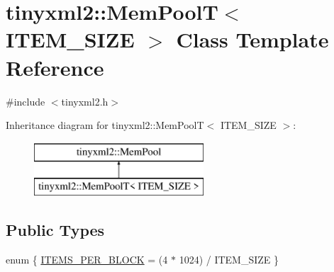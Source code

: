 \hypertarget{classtinyxml2_1_1_mem_pool_t}{}\section{tinyxml2\+:\+:Mem\+PoolT$<$ I\+T\+E\+M\+\_\+\+S\+I\+ZE $>$ Class Template Reference}
\label{classtinyxml2_1_1_mem_pool_t}


{\ttfamily \#include $<$tinyxml2.\+h$>$}

Inheritance diagram for tinyxml2\+:\+:Mem\+PoolT$<$ I\+T\+E\+M\+\_\+\+S\+I\+ZE $>$\+:\begin{figure}[H]
\begin{center}
\leavevmode
\includegraphics[height=2.000000cm]{classtinyxml2_1_1_mem_pool_t}
\end{center}
\end{figure}
\subsection*{Public Types}
\begin{DoxyCompactItemize}
\item 
enum \{ \hyperlink{classtinyxml2_1_1_mem_pool_t_a04cf45156e6f913f93972869ff8a1d94ab72c1e16d6626854c41feb19e60c54d1}{I\+T\+E\+M\+S\+\_\+\+P\+E\+R\+\_\+\+B\+L\+O\+CK} = (4 $\ast$ 1024) / I\+T\+E\+M\+\_\+\+S\+I\+ZE
 \}
\end{DoxyCompactItemize}
